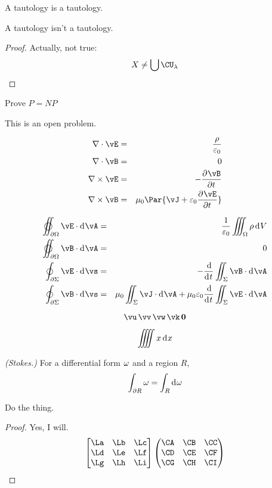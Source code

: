 \documentclass[11pt]{article}
\begin{document}
\begin{thm}
    A tautology is a tautology.    
\end{thm}

\begin{thm*}
    A tautology isn't a tautology.    
\end{thm*}
\begin{proof}
    Actually, not true:
    \[
        X \neq \bigcup \CU_\la
    \]
\end{proof}

\begin{exercise}
    Prove $P = NP$
\end{exercise}
\begin{solution}
    This is an open problem.
\end{solution}

\usevec

\begin{eqnarray*}
    \Dive\vE &=& \frac{\rho}{\ep_0} \\
    \Dive\vB &=& 0 \\
    \Curl\vE &=& -\pd{\vB}{t} \\
    \Curl\vB &=& \mu_0\Par{\vJ + \ep_0\pd{\vE}{t}}
\end{eqnarray*}

\useveca

\begin{eqnarray*}
    \varoiint_{\del\Om} \vE\cdot\D\vA &=& \frac{1}{\ep_0} \iiint_\Om \rho\D V \\
    \varoiint_{\del\Om} \vB\cdot\D\vA &=& 0 \\
    \oint_{\del\Si} \vE\cdot\D \vs &=& -\od{}{t}\iint_\Si \vB\cdot\D\vA \\
    \oint_{\del\Si} \vB\cdot\D \vs &=& 
        \mu_0\iint_\Si\vJ\cdot\D\vA + \mu_0\ep_0\od{}{t}\iint_\Si\vE\cdot\D\vA 
\end{eqnarray*}

\[ \vu\,\vv\,\vw\,\vk\,\vzero \]

\[ \iiiint x \D x\]

\begin{thm*} {\em (Stokes.)}
    For a differential form $\omega$ and a region $R$, 
    \[ \int_{\del R}\om = \int_R \D \om \]
\end{thm*}


\begin{psetProblem}
    Do the thing.
    \begin{proof}
        Yes, I will.
        \[ 
            \bthree{\La}{\Lb}{\Lc}{\Ld}{\Le}{\Lf}{\Lg}{\Lh}{\Li}
            \pthree{\CA}{\CB}{\CC}{\CD}{\CE}{\CF}{\CG}{\CH}{\CI} 
        \]
    \end{proof}
\end{psetProblem}
\end{document}
